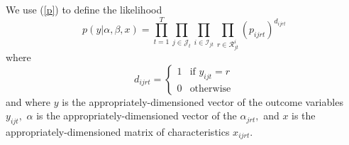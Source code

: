 We use (\ref{p}) to define the likelihood%
\begin{equation}
p\left( y|\alpha ,\beta ,x\right) =\prod_{t=1}^{T}\prod_{j\in \mathcal{J}%
_{t}}\prod_{i\in \mathcal{I}_{jt}}\prod_{r\in \mathcal{R}_{jt}^{i}}\left(
p_{ijrt}\right) ^{d_{ijrt}}  \label{likelihood}
\end{equation}%
where 
\begin{equation}
d_{ijrt}=\left\{ 
\begin{array}{cc}
1 & \text{if }y_{ijt}=r \\ 
0 & \text{otherwise}%
\end{array}%
\right.  \label{d}
\end{equation}%
and where $y$ is the appropriately-dimensioned vector of the outcome
variables $y_{ijt},$ $\alpha $ is the appropriately-dimensioned vector of
the $\alpha _{jrt},$ and $x$ is the appropriately-dimensioned matrix of
characteristics $x_{ijrt}$.

